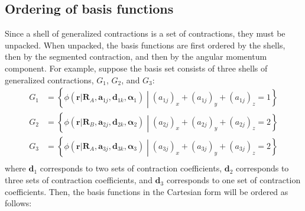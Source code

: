 \documentclass[letterpaper]{article}
\begin{document}
\subsection{Ordering of basis functions}
Since a shell of generalized contractions is a set of contractions, they must be
unpacked.
When unpacked, the basis functions are first ordered by the shells, then by the
segmented contraction, and then by the angular momentum component.
For example, suppose the basis set consists of three shells of generalized
contractions, $G_1$, $G_2$, and $G_3$:
\begin{equation}
  \begin{split}
    G_1 &= \left\{
      \phi (\mathbf{r} | \mathbf{R}_{A}, \mathbf{a}_{1j}, \mathbf{d}_{1k}, \boldsymbol{\alpha}_1)
      \middle|
      (a_{1j})_x + (a_{1j})_y + (a_{1j})_z = 1
    \right\}\\
    G_2 &= \left\{
      \phi (\mathbf{r} | \mathbf{R}_{B}, \mathbf{a}_{2j}, \mathbf{d}_{2k}, \boldsymbol{\alpha}_2)
      \middle|
      (a_{2j})_x + (a_{2j})_y + (a_{2j})_z = 2
    \right\}\\
    G_3 &= \left\{
      \phi (\mathbf{r} | \mathbf{R}_{A}, \mathbf{a}_{3j}, \mathbf{d}_{3k}, \boldsymbol{\alpha}_3)
      \middle|
      (a_{3j})_x + (a_{3j})_y + (a_{3j})_z = 2
    \right\}\\
  \end{split}
\end{equation}
where $\mathbf{d}_1$ corresponds to two sets of contraction coefficients,
$\mathbf{d}_2$ corresponds to three sets of contraction coefficients,
and $\mathbf{d}_3$ corresponds to one set of contraction coefficients.
Then, the basis functions in the Cartesian form will be ordered as follows:
\end{document}
